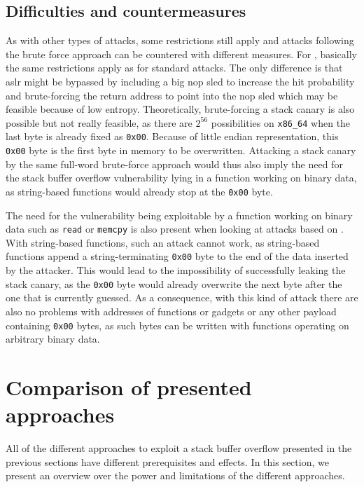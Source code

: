 \subsection{Difficulties and countermeasures}
\label{subsec:bf-countermeasures}

As with other types of attacks, some restrictions still apply and attacks following the brute force approach can be countered with different measures.
For , basically the same restrictions apply as for standard  attacks.
The only difference is that \gls{aslr} might be bypassed by including a big \acs{nop} sled to increase the hit probability and brute-forcing the return address to point into the \acs{nop} sled which may be feasible because of low entropy.
Theoretically, brute-forcing a stack canary is also possible but not really feasible, as there are $ 2^{56} $ possibilities on \texttt{x86\_64} when the last byte is already fixed as \texttt{0x00}.
Because of little endian representation, this \texttt{0x00} byte is the first byte in memory to be overwritten. Attacking a stack canary by the same full-word brute-force approach would thus also imply the need for the stack buffer overflow vulnerability lying in a function working on binary data, as string-based functions would already stop at the \texttt{0x00} byte.

The need for the vulnerability being exploitable by a function working on binary data such as \texttt{read} or \texttt{memcpy} is also present when looking at attacks based on .
With string-based functions, such an attack cannot work, as string-based functions append a string-terminating \texttt{0x00} byte to the end of the data inserted by the attacker.
This would lead to the impossibility of successfully leaking the stack canary, as the \texttt{0x00} byte would already overwrite the next byte after the one that is currently guessed.
As a consequence, with this kind of attack there are also no problems with addresses of functions or gadgets or any other payload containing \texttt{0x00} bytes, as such bytes can be written with functions operating on arbitrary binary data.

\section{Comparison of presented approaches}
\label{sec:attack-comparison}

All of the different approaches to exploit a stack buffer overflow presented in the previous sections have different prerequisites and effects.
In this section, we present an overview over the power and limitations of the different approaches.

